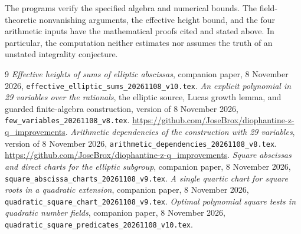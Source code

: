\documentclass[11pt,a4paper]{article}
\begin{document}
The programs verify the specified algebra and numerical bounds.
The field-theoretic nonvanishing arguments, the effective height
bound, and the four arithmetic inputs have the mathematical
proofs cited and stated above. In particular, the computation
neither estimates nor assumes the truth of an unstated
integrality conjecture.

\begin{thebibliography}{9}
\emph{Effective heights of sums of elliptic abscissas},
companion paper, 8 November 2026,
\nolinkurl{effective_elliptic_sums_20261108_v10.tex}.
\emph{An explicit polynomial in 29 variables over the rationals},
the elliptic source, Lucas growth lemma, and guarded finite-algebra
construction, version of 8 November 2026,
\nolinkurl{few_variables_20261108_v8.tex}.
\url{https://github.com/JoseBrox/diophantine-z-q_improvements}.
\emph{Arithmetic dependencies of the construction with 29 variables},
version of 8 November 2026,
\nolinkurl{arithmetic_dependencies_20261108_v8.tex}.
\url{https://github.com/JoseBrox/diophantine-z-q_improvements}.
\emph{Square abscissas and direct charts for the elliptic subgroup},
companion paper, 8 November 2026,
\nolinkurl{square_abscissa_charts_20261108_v9.tex}.
\emph{A single quartic chart for square roots in a quadratic extension},
companion paper, 8 November 2026,
\nolinkurl{quadratic_square_chart_20261108_v9.tex}.
\emph{Optimal polynomial square tests in quadratic number fields},
companion paper, 8 November 2026,
\nolinkurl{quadratic_square_predicates_20261108_v10.tex}.
\end{thebibliography}
\end{document}
